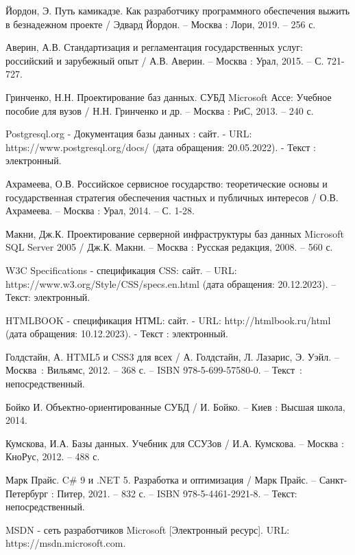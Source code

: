 \begin{thebibliography}{14}

     Йордон, Э. Путь камикадзе. Как разработчику программного обеспечения выжить в безнадежном проекте / Эдвард Йордон. – Москва : Лори, 2019. – 256 с.

     Аверин, А.В. Стандартизация и регламентация государственных услуг: российский и зарубежный опыт / А.В. Аверин. – Москва : Урал, 2015. – С. 721-727.

     Гринченко, Н.Н. Проектирование баз данных. СУБД Microsoft Ассе: Учебное пособие для вузов / Н.Н. Гринченко и др. – Москва : РиС, 2013. – 240 с.

     Postgresql.org -\- Документация базы данных : сайт. - URL: https://www.postgresql.org/docs/ (дата обращения: 20.05.2022). - Текст : электронный.

     Ахрамеева, О.В. Российское сервисное государство: теоретические основы и государственная стратегия обеспечения частных и публичных интересов / О.В. Ахрамеева. – Москва : Урал, 2014. – С. 1-28.

     Макни, Дж.К. Проектирование серверной инфраструктуры баз данных Microsoft SQL Server 2005 / Дж.К. Макни. – Москва : Русская редакция, 2008. – 560 с.

     W3C Specifications -\- спецификация CSS: сайт. – URL: https://www.w3.org/Style/CSS/specs.en.html (дата обращения: 20.12.2023). – Текст: электронный.

     HTMLBOOK -\- спецификация НТМL: сайт. - URL: http://htmlbook.ru/html (дата обращения: 10.12.2023). - Текст : электронный.

 		Голдстайн, А. HTML5 и CSS3 для всех / А. Голдстайн, Л. Лазарис, Э. Уэйл. – Москва~: Вильямс, 2012. – 368 с. – ISBN 978-5-699-57580-0. – Текст~: непосредственный.

     Бойко И. Объектно-ориентированные СУБД / И. Бойко. – Киев : Высшая школа, 2014.

     Кумскова, И.А. Базы данных. Учебник для ССУЗов / И.А. Кумскова. – Москва : КноРус, 2012. – 488 с.

     Марк Прайс. C\# 9 и .NET 5. Разработка и оптимизация / Марк Прайс. – Санкт-Петербург : Питер, 2021. – 832 с. – ISBN 978-5-4461-2921-8. – Текст: непосредственный.

     MSDN -\- сеть разработчиков Microsoft [Электронный ресурс]. URL: https://msdn.microsoft.com.


\end{thebibliography}

